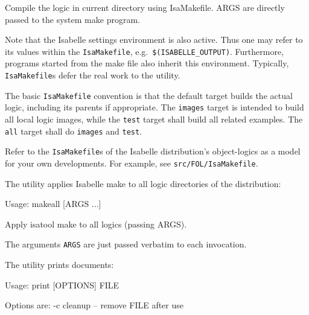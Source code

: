 \begin{isabellebody}
\begin{isamarkuptext}
\begin{ttbox}
  Compile the logic in current directory using IsaMakefile.
  ARGS are directly passed to the system make program.
\end{ttbox}

  Note that the Isabelle settings environment is also active. Thus one
  may refer to its values within the \verb|IsaMakefile|, e.g.\
  \verb|$(ISABELLE_OUTPUT)|. Furthermore, programs started from
  the make file also inherit this environment.  Typically, \verb|IsaMakefile|s defer the real work to the \hyperlink{tool.usedir}{\mbox{}} utility.

  \medskip The basic \verb|IsaMakefile| convention is that the
  default target builds the actual logic, including its parents if
  appropriate.  The \verb|images| target is intended to build all
  local logic images, while the \verb|test| target shall build
  all related examples.  The \verb|all| target shall do
  \verb|images| and \verb|test|.%
\end{isamarkuptext}%
\isamarkuptrue%
%
\isamarkuptrue%
%
\begin{isamarkuptext}%
Refer to the \verb|IsaMakefile|s of the Isabelle distribution's
  object-logics as a model for your own developments.  For example,
  see \verb|src/FOL/IsaMakefile|.%
\end{isamarkuptext}%
\isamarkuptrue%
%
\isamarkuptrue%
%
\begin{isamarkuptext}%
The \hypertarget{tool.makeall}{\hyperlink{tool.makeall}{\mbox{}}} utility applies Isabelle make to all logic
  directories of the distribution:
\begin{ttbox}
Usage: makeall [ARGS ...]

  Apply isatool make to all logics (passing ARGS).
\end{ttbox}

  The arguments \verb|ARGS| are just passed verbatim to each
  \hyperlink{tool.make}{\mbox{}} invocation.%
\end{isamarkuptext}%
\isamarkuptrue%
%
\isamarkuptrue%
%
\begin{isamarkuptext}%
The \hypertarget{tool.print}{\hyperlink{tool.print}{\mbox{}}} utility prints documents:
\begin{ttbox}
Usage: print [OPTIONS] FILE

  Options are:
    -c           cleanup -- remove FILE after use


\end{ttbox}
\end{isamarkuptext}
\end{isabellebody}
